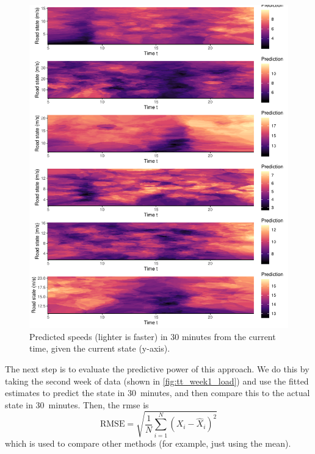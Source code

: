 \begin{knitrout}\small
{}\color{fgcolor}\begin{figure}

{\centering \includegraphics[width=\linewidth]{figure/tt_week0_grid-1} 

}

\caption[Predicted speeds (lighter is faster) in 30 minutes from the current time, given the current state (y-axis)]{Predicted speeds (lighter is faster) in 30 minutes from the current time, given the current state (y-axis).}\label{fig:tt_week0_grid}
\end{figure}


\end{knitrout}

The next step is to evaluate the predictive power of this approach. We do this by taking the second week of data (shown in \cref{fig:tt_week1_load}) and use the fitted estimates to predict the state in 30~minutes, and then compare this to the actual state in 30~minutes. Then, the \gls{rmse} is
\begin{equation}\label{eq:rmse}
\text{RMSE} = \sqrt{\frac{1}{N}\sum_{i=1}^N \left(X_i - \hat X_i\right)^2}
\end{equation}
which is used to compare other methods (for example, just using the mean).



